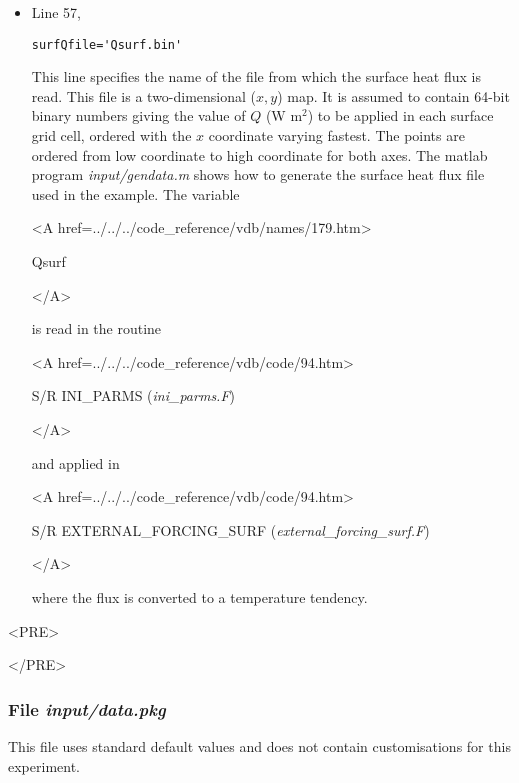 \begin{itemize}
\item Line 57,
\begin{verbatim}
surfQfile='Qsurf.bin'
\end{verbatim}
This line specifies the name of the file from which the surface heat flux 
is read. This file is a two-dimensional
($x,y$) map. It is assumed to contain 64-bit binary numbers 
giving the value of $Q$ (W m$^2$) to be applied in each surface grid cell, ordered with 
the $x$ coordinate varying fastest. The points are ordered from low coordinate
to high coordinate for both axes. The matlab program
{\it input/gendata.m} shows how to generate the 
surface heat flux file used in the example. 
The variable
{\bf
\begin{rawhtml} <A href=../../../code_reference/vdb/names/179.htm> \end{rawhtml}
Qsurf 
\begin{rawhtml} </A>\end{rawhtml}
}
is read in the routine
{\it
\begin{rawhtml} <A href=../../../code_reference/vdb/code/94.htm> \end{rawhtml}
S/R INI\_PARMS ({\it ini\_parms.F})
\begin{rawhtml} </A>\end{rawhtml}
}
and applied in  
{\it
\begin{rawhtml} <A href=../../../code_reference/vdb/code/94.htm> \end{rawhtml}
S/R EXTERNAL\_FORCING\_SURF ({\it external\_forcing\_surf.F})
\begin{rawhtml} </A>\end{rawhtml}
} where the flux is converted to a temperature tendency.


\end{itemize}


\begin{rawhtml}<PRE>\end{rawhtml}
\begin{small}

\end{small}
\begin{rawhtml}</PRE>\end{rawhtml}


\subsubsection{File {\it input/data.pkg}}

This file uses standard default values and does not contain
customisations for this experiment.

